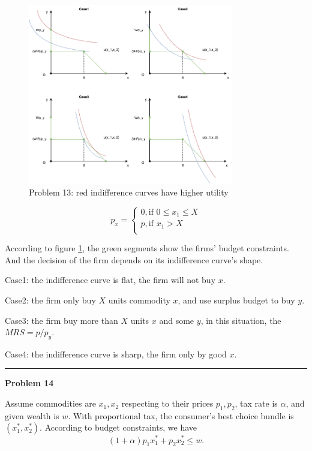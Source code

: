 \documentclass[letterpaper, 11pt]{article}
\newcommand{\1}{\mathds{1}}	%
\theoremstyle{definition}
\begin{document}
\begin{figure}[h] %
    \centering
    \includegraphics[width=0.8\textwidth]{images/micro1_ps1_p13.drawio.png}
    \caption{Problem 13: red indifference curves have higher utility}
    \label{fig:mylabel}
\end{figure}

\[
    p_x = \left\{\begin{array}{l}
        0 , \text{if } 0 \leq  x_1 \leq X \\
        p, \text{if } x_1 > X             \\
    \end{array}\right.
\]

According to figure \ref{fig:mylabel}, the green segments show the firms' budget constraints. And the decision of the firm depends on its indifference curve's shape.

Case1: the indifference curve is flat, the firm will not buy $x$.

Case2: the firm only buy $X$ units commodity $x$, and use surplus budget to buy $y$.

Case3: the firm buy more than $X$ units $x$ and some $y$, in this situation, the $MRS = p/p_y$.

Case4: the indifference curve is sharp, the firm only by good $x$.


\bigskip
\hrule
\bigskip

\textbf{Problem 14}


Assume commodities are $x_1, x_2$ respecting to their prices $p_1,p_2$, tax rate is $\alpha$, and given wealth is $w$. With proportional tax, the consumer's best choice bundle is $(x_1^*, x_2^*)$. According to budget constraints, we have \[
    (1+\alpha)p_1x_1^* + p_2x_2^* \leq w.
\]
\end{document}
